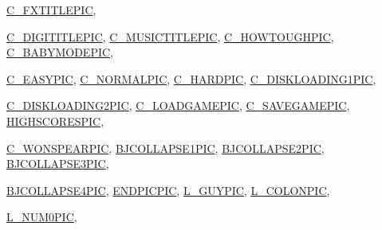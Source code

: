 \begin{DoxyCompactItemize}
\hyperlink{GFXV__SOD_8H_a82d35df9a0074a553383c0776300fa10a19983f3f75c9d005dcdb03206b85ca24}{C\_\-FXTITLEPIC}, 
\par
\hyperlink{GFXV__SOD_8H_a82d35df9a0074a553383c0776300fa10a857b31dc30ce768615ac16b978ac3a25}{C\_\-DIGITITLEPIC}, 
\hyperlink{GFXV__SOD_8H_a82d35df9a0074a553383c0776300fa10af5656a56b465ccc32a0b5414ac4a193e}{C\_\-MUSICTITLEPIC}, 
\hyperlink{GFXV__SOD_8H_a82d35df9a0074a553383c0776300fa10ae53068b9b633e1f83ffaa7bd7503e2ba}{C\_\-HOWTOUGHPIC}, 
\hyperlink{GFXV__SOD_8H_a82d35df9a0074a553383c0776300fa10af6bfd223b05ec46f8d90ae6e0c1ed3b2}{C\_\-BABYMODEPIC}, 
\par
\hyperlink{GFXV__SOD_8H_a82d35df9a0074a553383c0776300fa10a0f72f06d9e1033860ab54539dc5c70bd}{C\_\-EASYPIC}, 
\hyperlink{GFXV__SOD_8H_a82d35df9a0074a553383c0776300fa10ae0d349721155d47f5f2c3fe9bb801c5e}{C\_\-NORMALPIC}, 
\hyperlink{GFXV__SOD_8H_a82d35df9a0074a553383c0776300fa10a60d74a890234704b85df6a999482cbbd}{C\_\-HARDPIC}, 
\hyperlink{GFXV__SOD_8H_a82d35df9a0074a553383c0776300fa10ade40a21b3c042f724ca9a03c7ec785a6}{C\_\-DISKLOADING1PIC}, 
\par
\hyperlink{GFXV__SOD_8H_a82d35df9a0074a553383c0776300fa10ae986d373ee69aa43dc419ee4b76852c9}{C\_\-DISKLOADING2PIC}, 
\hyperlink{GFXV__SOD_8H_a82d35df9a0074a553383c0776300fa10a89c87733a096ae928570b65bad0ac199}{C\_\-LOADGAMEPIC}, 
\hyperlink{GFXV__SOD_8H_a82d35df9a0074a553383c0776300fa10ae52dae3851d36d02117e6b01a8e22f03}{C\_\-SAVEGAMEPIC}, 
\hyperlink{GFXV__SOD_8H_a82d35df9a0074a553383c0776300fa10afe080410990d17f0336a957261daeab7}{HIGHSCORESPIC}, 
\par
\hyperlink{GFXV__SOD_8H_a82d35df9a0074a553383c0776300fa10afd4c4c246bc4a535f34d3225cf04b027}{C\_\-WONSPEARPIC}, 
\hyperlink{GFXV__SOD_8H_a82d35df9a0074a553383c0776300fa10a1ef1148f7e81612298458d89a8214c5e}{BJCOLLAPSE1PIC}, 
\hyperlink{GFXV__SOD_8H_a82d35df9a0074a553383c0776300fa10a6ac875d12beede64761213307867934f}{BJCOLLAPSE2PIC}, 
\hyperlink{GFXV__SOD_8H_a82d35df9a0074a553383c0776300fa10ae8ecd958489081b2ebd0fe01889e82f4}{BJCOLLAPSE3PIC}, 
\par
\hyperlink{GFXV__SOD_8H_a82d35df9a0074a553383c0776300fa10a3e56a871665976ca4ce9e46d329132f4}{BJCOLLAPSE4PIC}, 
\hyperlink{GFXV__SOD_8H_a82d35df9a0074a553383c0776300fa10ab670adee69e1c76ff8b2232770be6499}{ENDPICPIC}, 
\hyperlink{GFXV__SOD_8H_a82d35df9a0074a553383c0776300fa10a47688ecf9582c02c3d9f3245a4099320}{L\_\-GUYPIC}, 
\hyperlink{GFXV__SOD_8H_a82d35df9a0074a553383c0776300fa10a38edafe6990261fa58dc676be6387743}{L\_\-COLONPIC}, 
\par
\hyperlink{GFXV__SOD_8H_a82d35df9a0074a553383c0776300fa10a9a1b1516353574023381db3dc7bd4ec4}{L\_\-NUM0PIC}, 

\end{DoxyCompactItemize}
